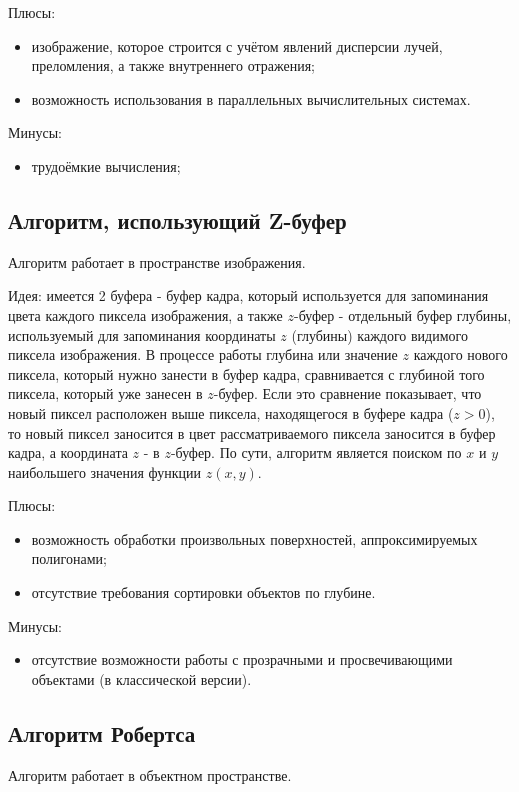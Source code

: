 Плюсы:
\begin{itemize}
    \item изображение, которое строится с учётом явлений дисперсии лучей, преломления, а также внутреннего отражения;
    \item возможность использования в параллельных вычислительных системах.
\end{itemize}

Минусы:
\begin{itemize}
    \item трудоёмкие вычисления\cite{tracer_proof};
\end{itemize}

\subsection{Алгоритм, использующий Z-буфер}
Алгоритм работает в пространстве изображения\cite{zbuf}.

Идея: имеется 2 буфера - буфер кадра, который используется для запоминания цвета каждого пиксела изображения, а также $z$-буфер - отдельный буфер глубины, используемый для запоминания координаты $z$ (глубины) каждого видимого пиксела изображения. В процессе работы глубина или значение $z$ каждого нового пиксела, который нужно занести в буфер кадра, сравнивается с глубиной того пиксела, который уже занесен в $z$-буфер. Если это сравнение показывает, что новый пиксел расположен выше пиксела, находящегося в буфере кадра ($z > 0$), то новый пиксел заносится в цвет рассматриваемого пиксела заносится в буфер кадра, а координата $z$ - в $z$-буфер. По сути, алгоритм является поиском по $x$ и $y$ наибольшего значения функции $z(x, y)$.

Плюсы:
\begin{itemize}
    \item возможность обработки произвольных поверхностей, аппроксимируемых полигонами;
    \item отсутствие требования сортировки объектов по глубине.
\end{itemize}

Минусы:
\begin{itemize}
    \item отсутствие возможности работы с прозрачными и просвечивающими объектами (в классической версии).
\end{itemize}

\subsection{Алгоритм Робертса}
Алгоритм работает в объектном пространстве\cite{robert}.

